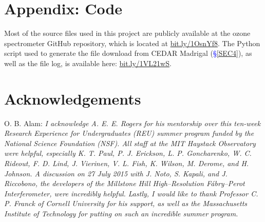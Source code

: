 \documentclass[11pt]{article}
\begin{document}
\section{Appendix: Code}
Most of the source files used in this project are publicly available at the ozone spectrometer GitHub repository, which is located at \url{bit.ly/1OsnYf8}. The Python script used to generate the file download from CEDAR Madrigal (\textcolor{blue}{\S\ref{SEC4}}), as well as the file log, is available here: \url{bit.ly/1VL21wS}.	





\section*{Acknowledgements}
O. B. Alam: \textit{I acknowledge A. E. E. Rogers for his mentorship over this ten-week Research Experience for Undergraduates (REU) summer program funded by the National Science Foundation (NSF). All staff at the MIT Haystack Observatory were helpful, especially K. T. Paul, P. J. Erickson, L. P. Goncharenko, W. C. Rideout, F. D. Lind, J. Vierinen, V. L. Fish, K. Wilson, M. Derome, and H. Johnson. A discussion on 27 July 2015 with J. Noto, S. Kapali, and J. Riccobono, the developers of the Millstone Hill High--Resolution F\'abry--Perot Interferometer, were incredibly helpful. Lastly, I would like to thank Professor C. P. Franck of Cornell University for his support, as well as the Massachusetts Institute of Technology for putting on such an incredible summer program.}





\end{document}
